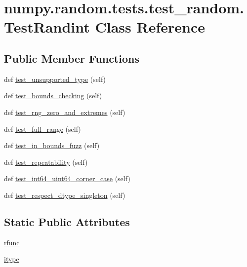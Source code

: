 \hypertarget{classnumpy_1_1random_1_1tests_1_1test__random_1_1TestRandint}{}\section{numpy.\+random.\+tests.\+test\+\_\+random.\+Test\+Randint Class Reference}
\label{classnumpy_1_1random_1_1tests_1_1test__random_1_1TestRandint}
\subsection*{Public Member Functions}
\begin{DoxyCompactItemize}
\item 
def \hyperlink{classnumpy_1_1random_1_1tests_1_1test__random_1_1TestRandint_ae8f1091ff3875f974a3ea27cc90b9914}{test\+\_\+unsupported\+\_\+type} (self)
\item 
def \hyperlink{classnumpy_1_1random_1_1tests_1_1test__random_1_1TestRandint_a687e3670405e37f669786d13d02c8ad3}{test\+\_\+bounds\+\_\+checking} (self)
\item 
def \hyperlink{classnumpy_1_1random_1_1tests_1_1test__random_1_1TestRandint_ad4accf058406dd038f43a718e82e4981}{test\+\_\+rng\+\_\+zero\+\_\+and\+\_\+extremes} (self)
\item 
def \hyperlink{classnumpy_1_1random_1_1tests_1_1test__random_1_1TestRandint_ae01dfb9d3986e013f1c91ddd2e7a7954}{test\+\_\+full\+\_\+range} (self)
\item 
def \hyperlink{classnumpy_1_1random_1_1tests_1_1test__random_1_1TestRandint_ac9f7fbd7a3942d4fe59c910efd165cf8}{test\+\_\+in\+\_\+bounds\+\_\+fuzz} (self)
\item 
def \hyperlink{classnumpy_1_1random_1_1tests_1_1test__random_1_1TestRandint_adfd03e94c2a645fcf8078fa58667d56b}{test\+\_\+repeatability} (self)
\item 
def \hyperlink{classnumpy_1_1random_1_1tests_1_1test__random_1_1TestRandint_ab0f9f80e062ca98936873477c0417593}{test\+\_\+int64\+\_\+uint64\+\_\+corner\+\_\+case} (self)
\item 
def \hyperlink{classnumpy_1_1random_1_1tests_1_1test__random_1_1TestRandint_af69501f34c9c03ec8d2e1216ffd6e7b1}{test\+\_\+respect\+\_\+dtype\+\_\+singleton} (self)
\end{DoxyCompactItemize}
\subsection*{Static Public Attributes}
\begin{DoxyCompactItemize}
\item 
\hyperlink{classnumpy_1_1random_1_1tests_1_1test__random_1_1TestRandint_acda1b2aba73cbb8043eaaf02defb6ad1}{rfunc}
\item 
\hyperlink{classnumpy_1_1random_1_1tests_1_1test__random_1_1TestRandint_af07a3eeb7e6e90551ced26c23250c844}{itype}
\end{DoxyCompactItemize}


